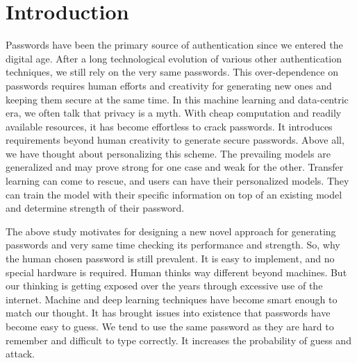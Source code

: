 \documentclass[runningheads]{llncs}
\begin{document}
\section{Introduction}
Passwords have been the primary source of authentication since we entered the digital age. After a long technological evolution of various other authentication techniques, we still rely on the very same passwords. This over-dependence on passwords requires human efforts and creativity for generating new ones and keeping them secure at the same time. In this machine learning and data-centric era, we often talk that privacy is a myth. With cheap computation and readily available resources, it has become effortless to crack passwords. %
It introduces requirements beyond human creativity to generate secure passwords. Above all, we have thought about personalizing this scheme. The prevailing models are generalized and may prove strong for one case and weak for the other. Transfer learning can come to rescue, and users can have their personalized models. They can train the model with their specific information on top of an existing model and determine strength of their password. %

The above study motivates for designing a new novel approach for generating passwords and very same time checking its performance and strength. So, why the human chosen password is still prevalent. It is easy to implement, and no special hardware is required. Human thinks way different beyond machines. %
But our thinking is getting exposed over the years through excessive use of the internet. Machine and deep learning techniques have become smart enough to match our thought. It has brought issues into existence that passwords have become easy to guess. We tend to use the same password as they are hard to remember and difficult to type correctly. %
It increases the probability of guess and attack. 
\end{document}
